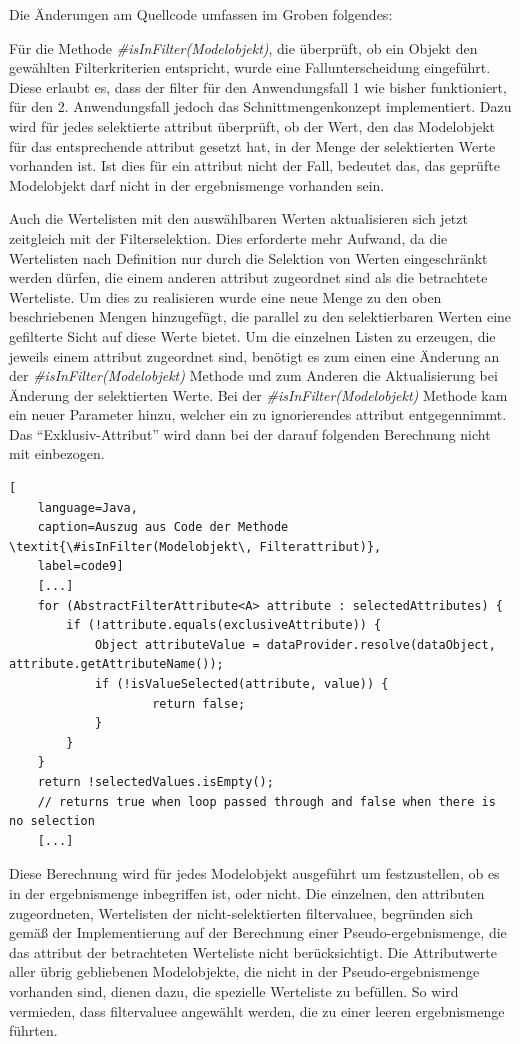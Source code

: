 Die Änderungen am Quellcode umfassen im Groben folgendes:

Für die Methode \textit{\#isInFilter(Modelobjekt)}, die überprüft, ob ein Objekt den gewählten Filterkriterien entspricht, wurde eine Fallunterscheidung eingeführt. Diese erlaubt es, dass der \gls{filter} für den Anwendungsfall 1 wie bisher funktioniert, für den 2. Anwendungsfall jedoch das Schnittmengenkonzept implementiert. Dazu wird für jedes selektierte \gls{attribut} überprüft, ob der Wert, den das Modelobjekt für das entsprechende \gls{attribut} gesetzt hat, in der Menge der selektierten Werte vorhanden ist. Ist dies für ein \gls{attribut} nicht der Fall, bedeutet das, das geprüfte Modelobjekt darf nicht in der \gls{ergebnismenge} vorhanden sein.

Auch die Wertelisten mit den auswählbaren Werten aktualisieren sich jetzt zeitgleich mit der Filterselektion. Dies erforderte mehr Aufwand, da die Wertelisten nach Definition nur durch die Selektion von Werten eingeschränkt werden dürfen, die einem anderen \gls{attribut} zugeordnet sind als die betrachtete Werteliste. Um dies zu realisieren wurde eine neue Menge zu den oben beschriebenen Mengen hinzugefügt, die parallel zu den selektierbaren Werten eine gefilterte Sicht auf diese Werte bietet. Um die einzelnen Listen zu erzeugen, die jeweils einem \gls{attribut} zugeordnet sind, benötigt es zum einen eine Änderung an der \textit{\#isInFilter(Modelobjekt)} Methode und zum Anderen die Aktualisierung bei Änderung der selektierten Werte. Bei der \textit{\#isInFilter(Modelobjekt)} Methode kam ein neuer Parameter hinzu, welcher ein zu ignorierendes \gls{attribut} entgegennimmt. Das \enquote{Exklusiv-Attribut} wird dann bei der darauf folgenden Berechnung nicht mit einbezogen.

\begin{lstlisting}[
    language=Java,
    caption=Auszug aus Code der Methode \textit{\#isInFilter(Modelobjekt\, Filterattribut)},
    label=code9]
	[...]
	for (AbstractFilterAttribute<A> attribute : selectedAttributes) {
		if (!attribute.equals(exclusiveAttribute)) {
			Object attributeValue = dataProvider.resolve(dataObject, attribute.getAttributeName());
			if (!isValueSelected(attribute, value)) {
					return false;
			}
    	}
	}
	return !selectedValues.isEmpty();
	// returns true when loop passed through and false when there is no selection
	[...]
\end{lstlisting}

Diese Berechnung wird für jedes Modelobjekt ausgeführt um festzustellen, ob es in der \gls{ergebnismenge} inbegriffen ist, oder nicht. Die einzelnen, den \gls{attribut}en zugeordneten, Wertelisten der nicht-selektierten \gls{filtervalue}e, begründen sich gemäß der Implementierung auf der Berechnung einer Pseudo-\gls{ergebnismenge}, die das \gls{attribut} der betrachteten Werteliste nicht berücksichtigt. Die Attributwerte aller übrig gebliebenen Modelobjekte, die nicht in der Pseudo-\gls{ergebnismenge} vorhanden sind, dienen dazu, die spezielle Werteliste zu befüllen. So wird vermieden, dass \gls{filtervalue}e angewählt werden, die zu einer leeren \gls{ergebnismenge} führten.

